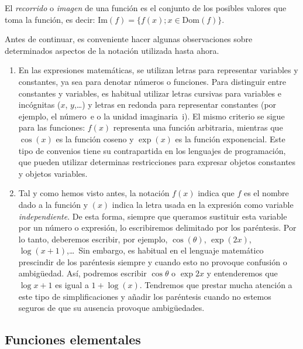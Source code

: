 El \emph{recorrido} o \emph{imagen} de una función es el conjunto de los posibles valores 
que toma la función, es decir: $\mathrm{Im}(f)=\{f(x); x\in\mathrm{Dom}(f)\}$.
\begin{nota}
Antes de continuar, es conveniente hacer algunas observaciones sobre determinados aspectos de la notación utilizada hasta ahora.
\begin{enumerate}
\item
En las expresiones matemáticas, se utilizan letras para representar variables y constantes, ya sea para denotar números o funciones.
Para distinguir entre constantes y variables, es habitual utilizar letras cursivas para variables e incógnitas ($x$, $y$,\dots) y letras en redonda para representar constantes
(por ejemplo, el número~e o la unidad imaginaria~$\mathrm{i}$). %
El mismo criterio se sigue para las funciones: $f(x)$ representa una función arbitraria, mientras que  $\cos(x)$ es la función coseno y $\exp(x)$ es la función exponencial.
Este tipo de convenios tiene su contrapartida en los lenguajes de programación, que pueden utilizar determinas restricciones para expresar objetos constantes y objetos variables.

\item
Tal y como hemos visto antes, la notación $f(x)$ indica que $f$ es el nombre dado a la función y $(x)$ indica la letra usada en la expresión como variable \emph{independiente}.
De esta forma, siempre que queramos sustituir esta variable por un número o expresión, lo escribiremos delimitado por los paréntesis.
Por lo tanto, deberemos escribir, por ejemplo,
$\cos(\theta)$, $\exp(2x)$, $\log(x+1)$,\dots\ 
Sin embargo, es habitual en el lenguaje matemático prescindir de los paréntesis siempre y cuando esto no provoque confusión o ambigüedad.
Así, podremos escribir $\cos\theta$ o $\exp 2x$ y entenderemos que $\log x+1$ es igual a $1+\log(x)$.
Tendremos que prestar mucha atención a este tipo de simplificaciones y añadir los paréntesis cuando no estemos seguros de que su ausencia provoque ambigüedades.
\end{enumerate}
\end{nota}

\subsection{Funciones elementales}

